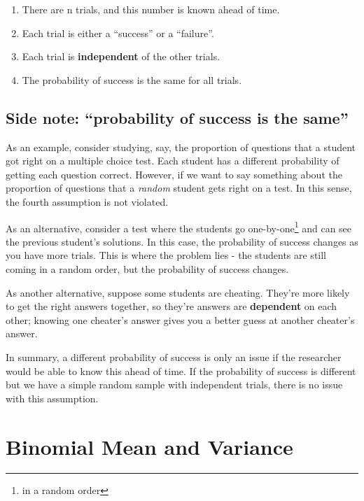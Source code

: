 \documentclass[
  letterpaper,
  DIV=11,
  numbers=noendperiod]{scrreprt}
\providecommand{\tightlist}{%
  \setlength{\itemsep}{0pt}\setlength{\parskip}{0pt}}\usepackage{longtable,booktabs,array}
\begin{document}
\begin{enumerate}
\def\labelenumi{\arabic{enumi}.}
\tightlist
\item
  There are n trials, and this number is known ahead of time.
\item
  Each trial is either a ``success'' or a ``failure''.
\item
  Each trial is \textbf{independent} of the other trials.
\item
  The probability of success is the same for all trials.
\end{enumerate}

\hypertarget{side-note-probability-of-success-is-the-same}{%
\subsection{Side note: ``probability of success is the
same''}\label{side-note-probability-of-success-is-the-same}}

As an example, consider studying, say, the proportion of questions that
a student got right on a multiple choice test. Each student has a
different probability of getting each question correct. However, if we
want to say something about the proportion of questions that a
\emph{random} student gets right on a test. In this sense, the fourth
assumption is not violated.

As an alternative, consider a test where the students go
one-by-one\footnote{in a random order} and can see the previous
student's solutions. In this case, the probability of success changes as
you have more trials. This is where the problem lies - the students are
still coming in a random order, but the probability of success changes.

As another alternative, suppose some students are cheating. They're more
likely to get the right answers together, so they're answers are
\textbf{dependent} on each other; knowing one cheater's answer gives you
a better guess at another cheater's answer.

In summary, a different probability of success is only an issue if the
researcher would be able to know this ahead of time. If the probability
of success is different but we have a simple random sample with
independent trials, there is no issue with this assumption.

\hypertarget{binomial-mean-and-variance}{%
\section{Binomial Mean and Variance}\label{binomial-mean-and-variance}}
\end{document}
